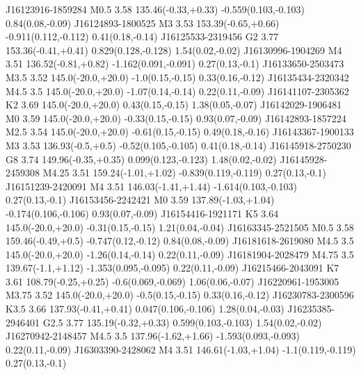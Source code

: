 J16123916-1859284  M0.5   3.58                   135.46(-0.33,+0.33)  -0.559(0.103,-0.103)              0.84(0.08,-0.09)
J16124893-1800525  M3     3.53                   153.39(-0.65,+0.66)  -0.911(0.112,-0.112)              0.41(0.18,-0.14)
J16125533-2319456  G2     3.77                   153.36(-0.41,+0.41)  0.829(0.128,-0.128)               1.54(0.02,-0.02)
J16130996-1904269  M4     3.51                   136.52(-0.81,+0.82)  -1.162(0.091,-0.091)              0.27(0.13,-0.1)
J16133650-2503473  M3.5   3.52                   145.0(-20.0,+20.0)   -1.0(0.15,-0.15)                  0.33(0.16,-0.12)
J16135434-2320342  M4.5   3.5                    145.0(-20.0,+20.0)   -1.07(0.14,-0.14)                 0.22(0.11,-0.09)
J16141107-2305362  K2     3.69                   145.0(-20.0,+20.0)   0.43(0.15,-0.15)                  1.38(0.05,-0.07)
J16142029-1906481  M0     3.59                   145.0(-20.0,+20.0)   -0.33(0.15,-0.15)                 0.93(0.07,-0.09)
J16142893-1857224  M2.5   3.54                   145.0(-20.0,+20.0)   -0.61(0.15,-0.15)                 0.49(0.18,-0.16)
J16143367-1900133  M3     3.53                   136.93(-0.5,+0.5)    -0.52(0.105,-0.105)               0.41(0.18,-0.14)
J16145918-2750230  G8     3.74                   149.96(-0.35,+0.35)  0.099(0.123,-0.123)               1.48(0.02,-0.02)
J16145928-2459308  M4.25  3.51                   159.24(-1.01,+1.02)  -0.839(0.119,-0.119)              0.27(0.13,-0.1)
J16151239-2420091  M4     3.51                   146.03(-1.41,+1.44)  -1.614(0.103,-0.103)              0.27(0.13,-0.1)
J16153456-2242421  M0     3.59                   137.89(-1.03,+1.04)  -0.174(0.106,-0.106)              0.93(0.07,-0.09)
J16154416-1921171  K5     3.64                   145.0(-20.0,+20.0)   -0.31(0.15,-0.15)                 1.21(0.04,-0.04)
J16163345-2521505  M0.5   3.58                   159.46(-0.49,+0.5)   -0.747(0.12,-0.12)                0.84(0.08,-0.09)
J16181618-2619080  M4.5   3.5                    145.0(-20.0,+20.0)   -1.26(0.14,-0.14)                 0.22(0.11,-0.09)
J16181904-2028479  M4.75  3.5                    139.67(-1.1,+1.12)   -1.353(0.095,-0.095)              0.22(0.11,-0.09)
J16215466-2043091  K7     3.61                   108.79(-0.25,+0.25)  -0.6(0.069,-0.069)                1.06(0.06,-0.07)
J16220961-1953005  M3.75  3.52                   145.0(-20.0,+20.0)   -0.5(0.15,-0.15)                  0.33(0.16,-0.12)
J16230783-2300596  K3.5   3.66                   137.93(-0.41,+0.41)  0.047(0.106,-0.106)               1.28(0.04,-0.03)
J16235385-2946401  G2.5   3.77                   135.19(-0.32,+0.33)  0.599(0.103,-0.103)               1.54(0.02,-0.02)
J16270942-2148457  M4.5   3.5                    137.96(-1.62,+1.66)  -1.593(0.093,-0.093)              0.22(0.11,-0.09)
J16303390-2428062  M4     3.51                   146.61(-1.03,+1.04)  -1.1(0.119,-0.119)                0.27(0.13,-0.1)